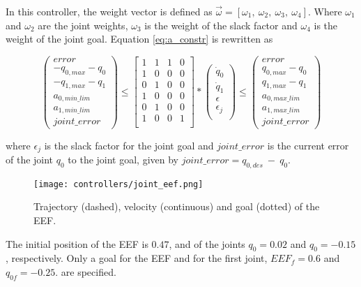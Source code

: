 In this controller, the weight vector is defined as $\vec{\omega} = [ \omega_{1},\ \omega_{2},\ \omega_{3},\ \omega_{4} ]$. Where $\omega_{1}$ and $\omega_{2}$ are the joint weights, $\omega_{3}$ is the weight of the slack factor and $\omega_{4}$ is the weight of the joint goal. Equation \ref{eq:a_constr} is rewritten as

$$
\left( \begin{array}{c}
error \\
-q_{0,max} - q_{0} \\
-q_{1,max} - q_{1} \\
a_{0,min\_lim} \\
a_{1,min\_lim} \\
joint\_error
\end{array}
\right)	\leq 
\left[ \begin{array}{cccc}
1 & 1 & 1 & 0 \\
1 & 0 & 0 & 0 \\
0 & 1 & 0 & 0 \\
1 & 0 & 0 & 0 \\
0 & 1 & 0 & 0 \\
1 & 0 & 0 & 1 \\
\end{array}
\right] *
\left( \begin{array}{c}
\dot{q}_{0} \\
\dot{q}_{1} \\
\epsilon \\
\epsilon_j \\
\end{array}
\right) 
\leq \left( \begin{array}{c}
error \\
q_{0,max} - q_{0} \\
q_{1,max} - q_{1} \\
a_{0,max\_lim} \\
a_{1,max\_lim} \\
joint\_error
\end{array}
\right)
$$

where $\epsilon_j$ is the slack factor for the joint goal and $joint\_error$ is the current error of the joint $q_{0}$ to the joint goal, given by $joint\_error = q_{0,des}\ -\ q_{0}$.

\begin{figure}[H]
	\centering
	\texttt{[image: controllers/joint\_eef.png]}
	\vspace{-10pt}
	\caption[Joint and EEF goal: EEF trajectory]{Trajectory (dashed), velocity (continuous) and goal (dotted) of the EEF.}
	\vspace{-15pt}
	\label{fig:joint_eef}
\end{figure}
The initial position of the EEF is $0.47$, and of the joints $q_{0}= 0.02$ and $q_{0}= -0.15$, respectively. Only a goal for the EEF and for the first joint, $EEF_{f}= 0.6$ and $q_{0f} = -0.25$. are specified.

